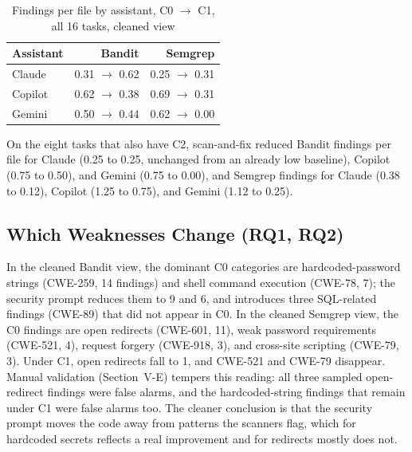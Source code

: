 \documentclass[conference]{IEEEtran}
\begin{document}
\begin{table}[t]
\caption{Findings per file by assistant, C0 $\rightarrow$ C1, all 16 tasks, cleaned view}
\label{tab:models}
\centering
\footnotesize
\begin{tabular}{@{}lrr@{}}
\toprule
Assistant & Bandit & Semgrep \\
\midrule
Claude & 0.31 $\rightarrow$ 0.62 & 0.25 $\rightarrow$ 0.31 \\
Copilot & 0.62 $\rightarrow$ 0.38 & 0.69 $\rightarrow$ 0.31 \\
Gemini & 0.50 $\rightarrow$ 0.44 & 0.62 $\rightarrow$ 0.00 \\
\bottomrule
\end{tabular}
\end{table}

On the eight tasks that also have C2, scan-and-fix reduced Bandit findings per file for Claude (0.25 to 0.25, unchanged from an already low baseline), Copilot (0.75 to 0.50), and Gemini (0.75 to 0.00), and Semgrep findings for Claude (0.38 to 0.12), Copilot (1.25 to 0.75), and Gemini (1.12 to 0.25).

\subsection{Which Weaknesses Change (RQ1, RQ2)}
In the cleaned Bandit view, the dominant C0 categories are hardcoded-password strings (CWE-259, 14 findings) and shell command execution (CWE-78, 7); the security prompt reduces them to 9 and 6, and introduces three SQL-related findings (CWE-89) that did not appear in C0. In the cleaned Semgrep view, the C0 findings are open redirects (CWE-601, 11), weak password requirements (CWE-521, 4), request forgery (CWE-918, 3), and cross-site scripting (CWE-79, 3). Under C1, open redirects fall to 1, and CWE-521 and CWE-79 disappear. Manual validation (Section~V-E) tempers this reading: all three sampled open-redirect findings were false alarms, and the hardcoded-string findings that remain under C1 were false alarms too. The cleaner conclusion is that the security prompt moves the code away from patterns the scanners flag, which for hardcoded secrets reflects a real improvement and for redirects mostly does not.
\end{document}
